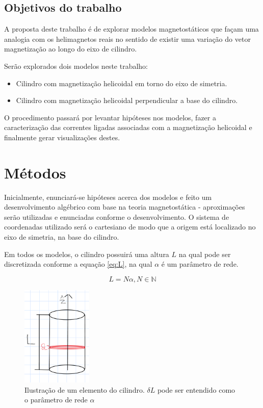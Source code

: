 \documentclass[a4paper, 12pt, twocolumn]{article}
\begin{document}
\subsection{Objetivos do trabalho}

A proposta deste trabalho é de explorar modelos magnetostáticos que façam uma analogia com os helimagnetos reais no sentido de existir uma variação do vetor magnetização ao longo do eixo de cilindro.

Serão explorados dois modelos neste trabalho:

\begin{itemize}
\item Cilindro com magnetização helicoidal em torno do eixo de simetria.
\item Cilindro com magnetização helicoidal perpendicular a base do cilindro.
\end{itemize}

O procedimento passará por levantar hipóteses nos modelos, fazer a caracterização das correntes ligadas associadas com a magnetização helicoidal e finalmente gerar visualizações destes.

\section{Métodos}

Inicialmente, enunciará-se hipóteses acerca dos modelos e feito um desenvolvimento algébrico com base na teoria magnetostática - aproximações serão utilizadas e enunciadas conforme o desenvolvimento. O sistema de coordenadas utilizado será o cartesiano de modo que a origem está localizado no eixo de simetria, na base do cilindro. 

Em todos os modelos, o cilindro possuirá uma altura $L$ na qual pode ser discretizada conforme a equação \ref{eq:L}, na qual $\alpha$ é um parâmetro de rede.

\begin{equation} \label{eq:L}
	L = N \alpha, N \in \mathbb{N}
\end{equation}

\begin{figure} 
    \caption{Ilustração de um elemento do cilindro. $\delta L$ pode ser entendido como o parâmetro de rede $\alpha$}
    \label{fig:cilindro}
    \centering
    \includegraphics[width=0.3\textwidth]{cilindro.png}
\end{figure} 
\end{document}
